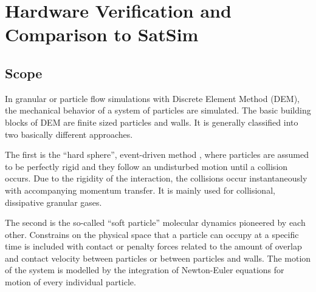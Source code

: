 \chapter{Hardware Verification and Comparison to SatSim}
\label{chp:verifHW}


\section{Scope}

In granular or particle flow simulations with Discrete Element Method (DEM),
the mechanical behavior of a system of particles are simulated. The basic
building blocks of DEM are finite sized particles and walls. It is generally
classified into two basically different approaches.

The first is the ``hard sphere'', event-driven method
\citep[e.g.][]{Luding-1994, Luding-2004}, where particles are assumed to be
perfectly rigid and they follow an undisturbed motion until a collision
occurs. Due to the rigidity of the interaction, the collisions occur
instantaneously with accompanying momentum transfer. It is mainly used for
collisional, dissipative granular gases.

The second is the so-called ``soft particle'' molecular dynamics pioneered by
each other. Constrains on the physical space that a particle can occupy at a
specific time is included with contact or penalty forces related to the
amount of overlap and contact velocity between particles or between particles
and walls. The motion of the system is modelled by the integration of
Newton-Euler equations for motion of every individual particle.
